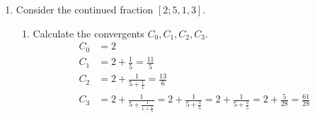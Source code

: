 \documentclass[11pt]{article}
\theoremstyle{definition}
\begin{document}
\begin{enumerate}
\begin{enumerate}
    \item Show that $\Lambda(n) = -\sum_{d\mid n} \mu(d)\log(d)$.
    \begin{proof}
        Using the Mobius inversion formula on $\log n = \sum_{d\mid n} \Lambda(n)$, we get 
        \[
            \Lambda(n) = \sum_{d\mid n}^{}\mu(d)\log(\frac{n}{d})
        \]
        By using algebra, we can rewrite this as 
        \begin{align*}
            \Lambda(n) &= \sum_{d\mid n}^{}\mu(d)(\log(n) - \log(d)) \\
            &= \sum_{d\mid n}^{}\mu(d)\log(n) - \sum_{d\mid n}^{}\mu(d)\log(d) \\
            &= \log(n)\sum_{d\mid n}^{}\mu(d) - \sum_{d\mid n}^{}\mu(d)\log(d)
        \end{align*}
        Consider the following property of the Mobius function:
        \[
            \sum_{d\mid n}^{} \mu(d) = 
            \begin{cases}
                1 \quad\text{if } n = 1 \\
                0 \quad\text{if } n > 1
            \end{cases}    
        \]
        If $n=1$, $\log(n)\sum_{d\mid n}^{}\mu(d) = 0$ since $\log(1) = 0.$
        
        So, $\log(n)\sum_{d\mid n}^{}\mu(d) = 0$ in all cases.

        This eliminates the term from the equation, leaving
        \[
            \Lambda(n) = -\sum_{d\mid n}^{}\mu(d)\log(d)
        \]
    \end{proof}

\end{enumerate}


    \item Consider the continued fraction $[2;5,1,3]$.
    \begin{enumerate}
        \item Calculate the convergents $C_0, C_1, C_2, C_3$.
        \begin{align*}
            C_0 &= 2 \\
            C_1 &= 2 + \frac{1}{5} = \frac{11}{5} \\
            C_2 &= 2 + \frac{1}{5 + \frac{1}{1}} = \frac{13}{6} \\
            C_3 &= 2 + \frac{1}{5 + \frac{1}{1 + \frac{1}{3}}} = 2 + \frac{1}{5 + \frac{3}{5}} = 2 + \frac{1}{5 + \frac{3}{5}} = 2 + \frac{5}{28} = \frac{61}{28}
        \end{align*}


\end{enumerate}
\end{enumerate}
\end{document}
